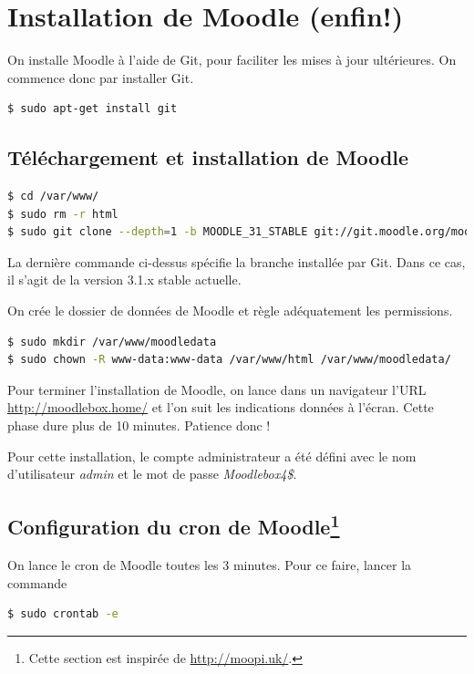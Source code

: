 \documentclass[11pt]{article}
\begin{document}
\section{Installation de Moodle (enfin!)}

On installe Moodle à l'aide de Git, pour faciliter les mises à jour ultérieures. On commence donc par installer Git.

\begin{lstlisting}[language=bash]
$ sudo apt-get install git
\end{lstlisting}

\subsection{Téléchargement et installation de Moodle}

\begin{lstlisting}[language=bash]
$ cd /var/www/
$ sudo rm -r html
$ sudo git clone --depth=1 -b MOODLE_31_STABLE git://git.moodle.org/moodle.git html
\end{lstlisting}
La dernière commande ci-dessus spécifie la branche installée par Git. Dans ce cas, il s'agit de la version 3.1.x stable actuelle.

On crée le dossier de données de Moodle et règle adéquatement les permissions.
\begin{lstlisting}[language=bash]
$ sudo mkdir /var/www/moodledata
$ sudo chown -R www-data:www-data /var/www/html /var/www/moodledata/
\end{lstlisting}

Pour terminer l'installation de Moodle, on lance dans un navigateur l'URL \url{http://moodlebox.home/} et l'on suit les indications données à l'écran. Cette phase dure plus de 10 minutes. Patience donc !

Pour cette installation, le compte administrateur a été défini avec le nom d'utilisateur \emph{admin} et le mot de passe \emph{Moodlebox4\$}.

\subsection[Configuration du cron de Moodle]{Configuration du cron de Moodle\footnote{Cette section est inspirée de \url{http://moopi.uk/}.}}

On lance le cron de Moodle toutes les 3 minutes. Pour ce faire, lancer la commande

\begin{lstlisting}[language=bash]
$ sudo crontab -e
\end{lstlisting}
\end{document}
